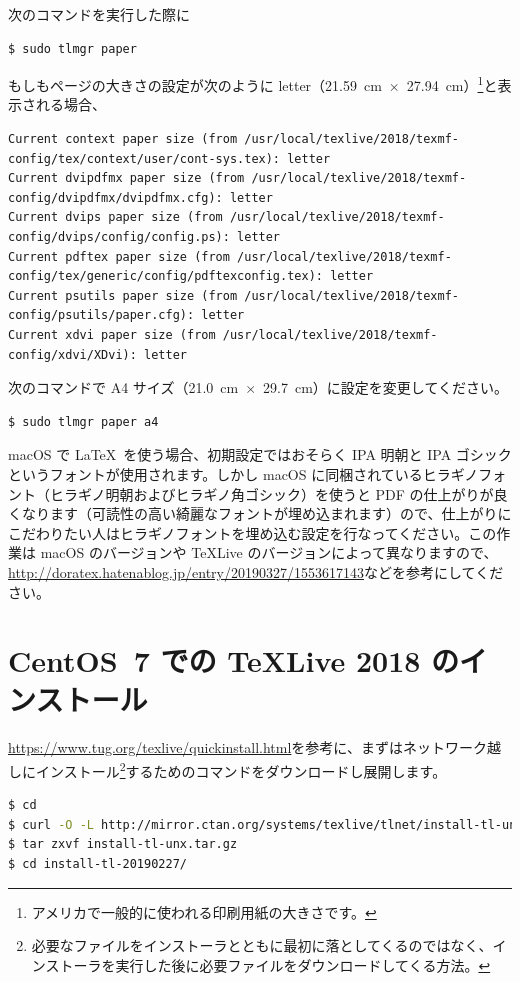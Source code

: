 次のコマンドを実行した際に
\begin{lstlisting}[language=bash]
$ sudo tlmgr paper
\end{lstlisting}
もしもページの大きさの設定が次のように letter（21.59~cm~$\times$~27.94~cm）\footnote{アメリカで一般的に使われる印刷用紙の大きさです。}と表示される場合、
\begin{lstlisting}
Current context paper size (from /usr/local/texlive/2018/texmf-config/tex/context/user/cont-sys.tex): letter
Current dvipdfmx paper size (from /usr/local/texlive/2018/texmf-config/dvipdfmx/dvipdfmx.cfg): letter
Current dvips paper size (from /usr/local/texlive/2018/texmf-config/dvips/config/config.ps): letter
Current pdftex paper size (from /usr/local/texlive/2018/texmf-config/tex/generic/config/pdftexconfig.tex): letter
Current psutils paper size (from /usr/local/texlive/2018/texmf-config/psutils/paper.cfg): letter
Current xdvi paper size (from /usr/local/texlive/2018/texmf-config/xdvi/XDvi): letter
\end{lstlisting}
次のコマンドで A4 サイズ（21.0~cm~$\times$~29.7~cm）に設定を変更してください。
\begin{lstlisting}[language=bash]
$ sudo tlmgr paper a4
\end{lstlisting}

macOS で \LaTeX\ を使う場合、初期設定ではおそらく IPA 明朝と IPA ゴシックというフォントが使用されます。しかし macOS に同梱されているヒラギノフォント（ヒラギノ明朝およびヒラギノ角ゴシック）を使うと PDF の仕上がりが良くなります（可読性の高い綺麗なフォントが埋め込まれます）ので、仕上がりにこだわりたい人はヒラギノフォントを埋め込む設定を行なってください。この作業は macOS のバージョンや TeXLive のバージョンによって異なりますので、\url{http://doratex.hatenablog.jp/entry/20190327/1553617143}などを参考にしてください。

\section{CentOS~7 での TeXLive 2018 のインストール}

\url{https://www.tug.org/texlive/quickinstall.html}を参考に、まずはネットワーク越しにインストール\footnote{必要なファイルをインストーラとともに最初に落としてくるのではなく、インストーラを実行した後に必要ファイルをダウンロードしてくる方法。}するためのコマンドをダウンロードし展開します。

\begin{lstlisting}[language=bash]
$ cd
$ curl -O -L http://mirror.ctan.org/systems/texlive/tlnet/install-tl-unx.tar.gz
$ tar zxvf install-tl-unx.tar.gz
$ cd install-tl-20190227/
\end{lstlisting}

